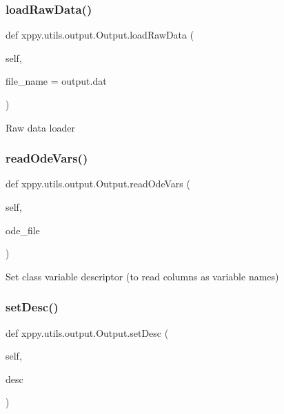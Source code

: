 \subsubsection{\texorpdfstring{load\+Raw\+Data()}{loadRawData()}}
{\footnotesize\ttfamily def xppy.\+utils.\+output.\+Output.\+load\+Raw\+Data (\begin{DoxyParamCaption}\item[{}]{self,  }\item[{}]{file\+\_\+name = {\ttfamily \textquotesingle{}output.dat\textquotesingle{}} }\end{DoxyParamCaption})}

\begin{DoxyVerb}Raw data loader
\end{DoxyVerb}
 \mbox{\label{classxppy_1_1utils_1_1output_1_1_output_a849eea0f7eef69c7a504601052a345b5}} 
\subsubsection{\texorpdfstring{read\+Ode\+Vars()}{readOdeVars()}}
{\footnotesize\ttfamily def xppy.\+utils.\+output.\+Output.\+read\+Ode\+Vars (\begin{DoxyParamCaption}\item[{}]{self,  }\item[{}]{ode\+\_\+file }\end{DoxyParamCaption})}

\begin{DoxyVerb}Set class variable descriptor (to read columns as variable names)
\end{DoxyVerb}
 \mbox{\label{classxppy_1_1utils_1_1output_1_1_output_ac458b3813bb3eff4460eadfc7857c157}} 
\subsubsection{\texorpdfstring{set\+Desc()}{setDesc()}}
{\footnotesize\ttfamily def xppy.\+utils.\+output.\+Output.\+set\+Desc (\begin{DoxyParamCaption}\item[{}]{self,  }\item[{}]{desc }\end{DoxyParamCaption})}


